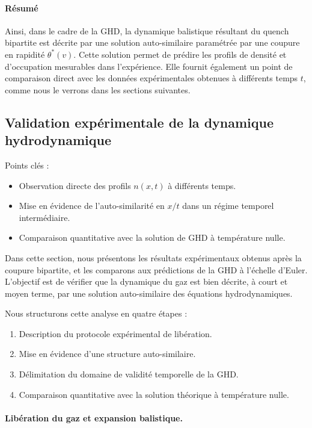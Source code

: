 \paragraph{Résumé}

Ainsi, dans le cadre de la GHD, la dynamique balistique résultant du quench bipartite est décrite par une solution auto-similaire paramétrée par une coupure en rapidité $\theta^*(v)$. Cette solution permet de prédire les profils de densité et d’occupation mesurables dans l’expérience. Elle fournit également un point de comparaison direct avec les données expérimentales obtenues à différents temps $t$, comme nous le verrons dans les sections suivantes.

\subsection{Validation expérimentale de la dynamique hydrodynamique}
\label{sec.don_exp}

{\color{blue}
Points clés :
\begin{itemize}
	\item Observation directe des profils $n(x,t)$ à différents temps.
	\item Mise en évidence de l’auto-similarité en $x/t$ dans un régime temporel intermédiaire.
	\item Comparaison quantitative avec la solution de GHD à température nulle.
\end{itemize}
}


Dans cette section, nous présentons les résultats expérimentaux obtenus après la coupure bipartite, et les comparons aux prédictions de la GHD à l’échelle d’Euler. L’objectif est de vérifier que la dynamique du gaz est bien décrite, à court et moyen terme, par une solution auto-similaire des équations hydrodynamiques.

Nous structurons cette analyse en quatre étapes :
\begin{enumerate}
    \item Description du protocole expérimental de libération.
    \item Mise en évidence d’une structure auto-similaire.
    \item Délimitation du domaine de validité temporelle de la GHD.
    \item Comparaison quantitative avec la solution théorique à température nulle.
\end{enumerate}

\paragraph{Libération du gaz et expansion balistique.}

